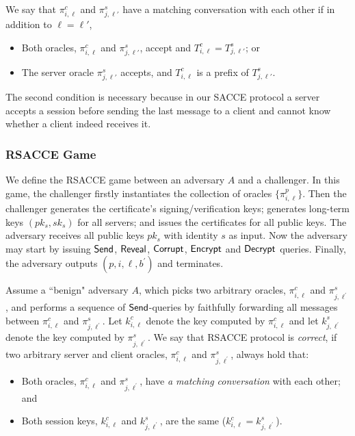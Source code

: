 \begin{definition}
 We say that $\pi^c_{i,\ell}$ and $\pi^s_{j,\ell'}$ have a matching conversation with each other if  in addition to $\ell=\ell'$,
 \begin{itemize}
  \item{Both oracles, $\pi^c_{i, \ell}$ and $\pi^s_{j,\ell'}$, accept and
  $T^c_{i,\ell} = T^s_{j,\ell'}$; or }
  \item{The server oracle $\pi^s_{j, \ell'}$ accepts,
  and $T^c_{i,\ell}$ is a prefix of $T^s_{j,\ell'}$.}
 \end{itemize}
\end{definition}
\begin{remark}
 The second condition is necessary because in our SACCE protocol
 a server accepts a session before sending the last message to a client
 and cannot know whether a client indeed receives it.
\end{remark}

\subsubsection{RSACCE Game}
We define the RSACCE game between an adversary $A$ and a challenger.
In this game, the challenger firstly instantiates the collection of oracles
$\{\pi^p_{i,\ell}\}$.
Then the challenger generates the certificate's signing/verification keys;
generates long-term keys $(pk_s, sk_s)$ for all servers;
and issues the certificates for all public keys.
The adversary receives all public keys $pk_s$ with identity $s$ as input.
Now the adversary may start by issuing $\mathsf{Send}$, $\mathsf{Reveal}$, $\mathsf{Corrupt}$, $\mathsf{Encrypt}$ and $\mathsf{Decrypt}$ queries.
Finally, the adversary outputs $(p, i, \ell, b^{\prime})$ and terminates.

\begin{definition}[Correctness]
 Assume a ``benign" adversary $A$, which picks two arbitrary oracles, $\pi^c_{i, \ell}$ and $\pi^s_{j, \ell^{\prime}}$,
 and performs a sequence of $\mathsf{Send}$-queries by faithfully forwarding all messages
 between $\pi^c_{i, \ell}$ and $\pi^s_{j, \ell^{\prime}}$.
 Let $k^c_{i, \ell}$ denote the key computed by $\pi^c_{i, \ell}$
 and let $k^s_{j, \ell^{\prime}}$ denote the key computed by $\pi^s_{j, \ell^{\prime}}$.
 We say that RSACCE protocol is \textit{correct}, if two arbitrary server and client oracles, $\pi^c_{i, \ell}$ and $\pi^s_{j, \ell^{\prime}}$, always hold that:
 \begin{itemize}
  \item{Both oracles, $\pi^c_{i, \ell}$ and $\pi^s_{j, \ell^{\prime}}$, have \textit{a matching conversation} with each other; and}
  \item{Both session keys, $k^c_{i, \ell}$ and $k^s_{j, \ell^{\prime}}$, are the same ($k^c_{i, \ell} = k^s_{j, \ell^{\prime}}$).}
 \end{itemize}
\end{definition}

